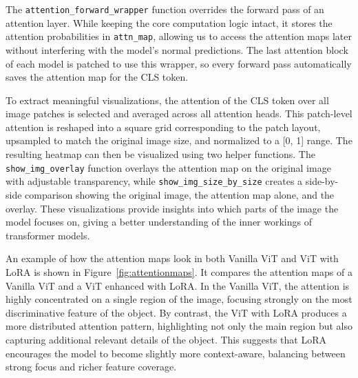 \documentclass[10pt]{article}
\begin{document}
The \texttt{attention\_forward\_wrapper} function overrides the forward pass of an attention layer. While keeping the core computation logic intact, it stores the attention probabilities in \texttt{attn\_map}, allowing us to access the attention maps later without interfering with the model's normal predictions. The last attention block of each model is patched to use this wrapper, so every forward pass automatically saves the attention map for the CLS token.

To extract meaningful visualizations, the attention of the CLS token over all image patches is selected and averaged across all attention heads. This patch-level attention is reshaped into a square grid corresponding to the patch layout, upsampled to match the original image size, and normalized to a [0, 1] range. The resulting heatmap can then be visualized using two helper functions. The \texttt{show\_img\_overlay} function overlays the attention map on the original image with adjustable transparency, while \texttt{show\_img\_size\_by\_size} creates a side-by-side comparison showing the original image, the attention map alone, and the overlay. These visualizations provide insights into which parts of the image the model focuses on, giving a better understanding of the inner workings of transformer models.

An example of how the attention maps look in both Vanilla ViT and ViT with LoRA is shown in Figure~\ref{fig:attentionmaps}. It compares the attention maps of a Vanilla ViT and a ViT enhanced with LoRA. In the Vanilla ViT, the attention is highly concentrated on a single region of the image, focusing strongly on the most discriminative feature of the object. By contrast, the ViT with LoRA produces a more distributed attention pattern, highlighting not only the main region but also capturing additional relevant details of the object. This suggests that LoRA encourages the model to become slightly more context-aware, balancing between strong focus and richer feature coverage.
\end{document}
